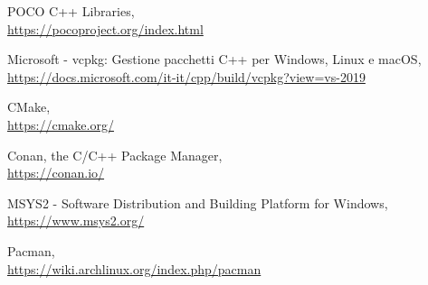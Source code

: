 \documentclass[a4paper,12pt,oneside]{book}
\begin{document}
\begin{thebibliography}{26}
\begin{spacing}{1.25}
	POCO C++ Libraries,
	\\\url{https://pocoproject.org/index.html}
	
	Microsoft - vcpkg: Gestione pacchetti C++ per Windows, Linux e macOS,
	\\\url{https://docs.microsoft.com/it-it/cpp/build/vcpkg?view=vs-2019}
	
	CMake,
	\\\url{https://cmake.org/}
	
	Conan, the C/C++ Package Manager,
	\\\url{https://conan.io/}
	
	MSYS2 - Software Distribution and Building Platform for Windows,
	\\\url{https://www.msys2.org/}
	
	Pacman,
	\\\url{https://wiki.archlinux.org/index.php/pacman}
	\end{spacing}
\end{thebibliography}
\end{document}
